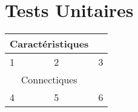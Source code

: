 \chapter{Tests Unitaires}


\begin{tabular}{|p{}  |p{}  |p{} |}	
\hline
\multicolumn{2}{|c|}{Caractéristiques}\\
\hline
1 & 2 & 3 \\
\hline
\multicolumn{2}{|c|}{Connectiques}\\
\hline
4 & 5 & 6 \\ 
\hline
\end{tabular}